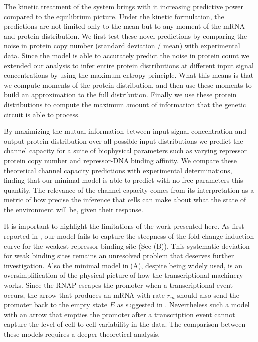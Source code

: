 The kinetic treatment of the system brings with it increasing predictive power
compared to the equilibrium picture. Under the kinetic formulation, the
predictions are not limited only to the mean but to any moment of the mRNA and
protein distribution. We first test these novel predictions by comparing the
noise in protein copy number (standard deviation / mean) with experimental data.
Since the model is able to accurately predict the noise in protein count we
extended our analysis to infer entire protein distributions at different input
signal concentrations by using the maximum entropy principle. What this means is
that we compute moments of the protein distribution, and then use these
moments to build an approximation to the full distribution. Finally we use these
protein distributions to compute the maximum amount of information that the
genetic circuit is able to process.

By maximizing the mutual information between input signal concentration and
output protein distribution over all possible input distributions we predict
the channel capacity for a suite of biophysical parameters such as varying
repressor protein copy number and repressor-DNA binding affinity. We compare
these theoretical channel capacity predictions with experimental determinations,
finding that our minimal model is able to predict with no free parameters this
quantity. The relevance of the channel capacity comes from its interpretation as
a metric of how precise the inference that cells can make about what the state
of the environment will be, given their response.

It is important to highlight the limitations of the work presented here. As
first reported in \cite{Razo-Mejia2018}, our model fails to capture the
steepness of the fold-change induction curve for the weakest repressor binding
site (See (B)). This systematic deviation for weak binding
sites remains an unresolved problem that deserves further investigation. Also
the minimal model in (A), despite being widely used,
is an oversimplification of the physical picture of how the transcriptional
machinery works. Since the RNAP escapes the promoter when a transcriptional
event occurs, the arrow that produces an mRNA with rate $r_m$ should also send
the promoter back to the empty state $E$ as suggested in \cite{Phillips2015}.
Nevertheless such a model with an arrow that empties the promoter after a
transcription event cannot capture the level of cell-to-cell variability in the
data. The comparison between these models requires a deeper theoretical
analysis.

